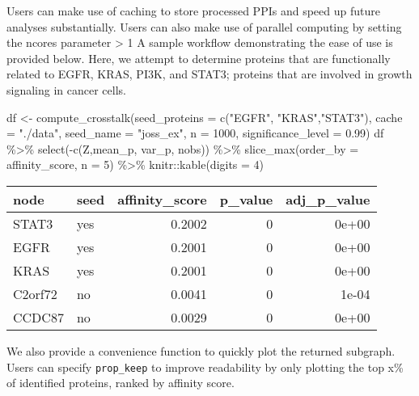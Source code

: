 \documentclass{article}
\newenvironment{Shaded}{\begin{snugshade}}{\end{snugshade}}
\newcommand{\AttributeTok}[1]{\textcolor[rgb]{0.77,0.63,0.00}{#1}}
\newcommand{\DecValTok}[1]{\textcolor[rgb]{0.00,0.00,0.81}{#1}}
\newcommand{\FloatTok}[1]{\textcolor[rgb]{0.00,0.00,0.81}{#1}}
\newcommand{\FunctionTok}[1]{\textcolor[rgb]{0.00,0.00,0.00}{#1}}
\newcommand{\NormalTok}[1]{#1}
\newcommand{\OtherTok}[1]{\textcolor[rgb]{0.56,0.35,0.01}{#1}}
\newcommand{\SpecialCharTok}[1]{\textcolor[rgb]{0.00,0.00,0.00}{#1}}
\newcommand{\StringTok}[1]{\textcolor[rgb]{0.31,0.60,0.02}{#1}}
\begin{document}
Users can make use of caching to store processed PPIs and speed up
future analyses substantially. Users can also make use of parallel
computing by setting the ncores parameter \textgreater{} 1 A sample
workflow demonstrating the ease of use is provided below. Here, we
attempt to determine proteins that are functionally related to EGFR,
KRAS, PI3K, and STAT3; proteins that are involved in growth signaling in
cancer cells.

\begin{Shaded}
\begin{Highlighting}[]
\NormalTok{df }\OtherTok{\textless{}{-}} \FunctionTok{compute\_crosstalk}\NormalTok{(}\AttributeTok{seed\_proteins =} \FunctionTok{c}\NormalTok{(}\StringTok{"EGFR"}\NormalTok{, }\StringTok{"KRAS"}\NormalTok{,}\StringTok{"STAT3"}\NormalTok{), }
                        \AttributeTok{cache =} \StringTok{"./data"}\NormalTok{, }\AttributeTok{seed\_name =} \StringTok{"joss\_ex"}\NormalTok{, }\AttributeTok{n =} \DecValTok{1000}\NormalTok{, }
                        \AttributeTok{significance\_level =} \FloatTok{0.99}\NormalTok{)}
\NormalTok{df }\SpecialCharTok{\%\textgreater{}\%}
  \FunctionTok{select}\NormalTok{(}\SpecialCharTok{{-}}\FunctionTok{c}\NormalTok{(Z,mean\_p, var\_p, nobs)) }\SpecialCharTok{\%\textgreater{}\%}
  \FunctionTok{slice\_max}\NormalTok{(}\AttributeTok{order\_by =}\NormalTok{ affinity\_score, }\AttributeTok{n =} \DecValTok{5}\NormalTok{) }\SpecialCharTok{\%\textgreater{}\%} 
\NormalTok{  knitr}\SpecialCharTok{::}\FunctionTok{kable}\NormalTok{(}\AttributeTok{digits =} \DecValTok{4}\NormalTok{)}
\end{Highlighting}
\end{Shaded}

\begin{longtable}[]{@{}llrrr@{}}
\toprule
node & seed & affinity\_score & p\_value & adj\_p\_value \\
\midrule
\endhead
STAT3 & yes & 0.2002 & 0 & 0e+00 \\
EGFR & yes & 0.2001 & 0 & 0e+00 \\
KRAS & yes & 0.2001 & 0 & 0e+00 \\
C2orf72 & no & 0.0041 & 0 & 1e-04 \\
CCDC87 & no & 0.0029 & 0 & 0e+00 \\
\bottomrule
\end{longtable}

We also provide a convenience function to quickly plot the returned
subgraph. Users can specify \texttt{prop\_keep} to improve readability
by only plotting the top x\% of identified proteins, ranked by affinity
score.
\end{document}
